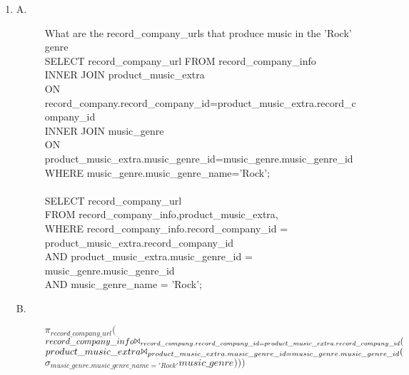 \documentclass{article}
\begin{document}
\begin{enumerate}

\item
\begin{description}
\item[A.]
\textsf{What are the record\_company\_urls that produce music in the 'Rock' genre\\}
SELECT record\_company\_url FROM record\_company\_info\\
INNER JOIN product\_music\_extra\\ 
ON record\_company.record\_company\_id=product\_music\_extra.record\_company\_id\\
INNER JOIN music\_genre\\
ON product\_music\_extra.music\_genre\_id=music\_genre.music\_genre\_id\\
WHERE music\_genre.music\_genre\_name='Rock';\\
\\
SELECT record\_company\_url\\
FROM record\_company\_info,product\_music\_extra,\\
WHERE record\_company\_info.record\_company\_id = product\_music\_extra.record\_company\_id\\
AND product\_music\_extra.music\_genre\_id = music\_genre.music\_genre\_id\\
AND music\_genre\_name = 'Rock';\\
\item[B.]
$\pi_{record\_company\_url}($\\
$record\_company\_info \Bowtie_{record\_company.record\_company\_id=product\_music\_extra.record\_company\_id} ($\\
$product\_music\_extra \Bowtie_{product\_music\_extra.music\_genre\_id=music\_genre.music\_genre\_id} ($\\
$\sigma_{music\_genre.music\_genre\_name='Rock'}music\_genre)))$\\
\end{description}
\end{enumerate}
\end{document}
